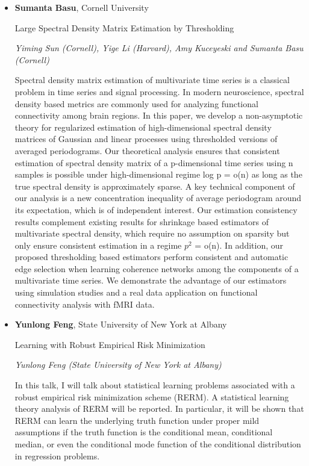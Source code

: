 \begin{itemize}
\item \textbf{Sumanta Basu}, Cornell University

Large Spectral Density Matrix Estimation by Thresholding

\emph{\footnotesize Yiming Sun (Cornell), Yige Li (Harvard), Amy Kuceyeski and Sumanta Basu (Cornell)}

Spectral density matrix estimation of multivariate time series  is a classical problem in time series and signal processing. In modern neuroscience, spectral density based metrics are commonly used for analyzing functional connectivity among brain regions. In this paper, we develop a non-asymptotic theory for regularized estimation of high-dimensional spectral density matrices of Gaussian and linear processes using thresholded versions of averaged periodograms. Our theoretical analysis ensures that consistent estimation of spectral density matrix of a p-dimensional time series using n samples is possible under high-dimensional regime log p = o(n) as long as the true spectral density is approximately sparse. A key technical component of our analysis is a new  concentration inequality of average periodogram around its expectation, which is of independent interest. Our estimation consistency results complement existing results for shrinkage based estimators of multivariate spectral density, which require no assumption on sparsity but only ensure consistent estimation in a regime $p^2$ = o(n). In addition, our proposed thresholding based estimators perform consistent and automatic edge selection when learning  coherence networks among the components of a  multivariate time series.  We demonstrate the advantage of our estimators using simulation studies and a real data application on functional connectivity analysis with fMRI data.

\item \textbf{Yunlong Feng}, State University of New York at Albany

Learning with Robust Empirical Risk Minimization

\emph{\footnotesize Yunlong Feng (State University of New York at Albany)}

In this talk, I will talk about statistical learning problems associated with a robust empirical risk minimization scheme (RERM). A statistical learning theory analysis of RERM will be reported. In particular, it will be shown that RERM can learn the underlying truth function under proper mild assumptions if the truth function is the conditional mean, conditional median, or even the conditional mode function of the conditional distribution in regression problems.

\end{itemize}

